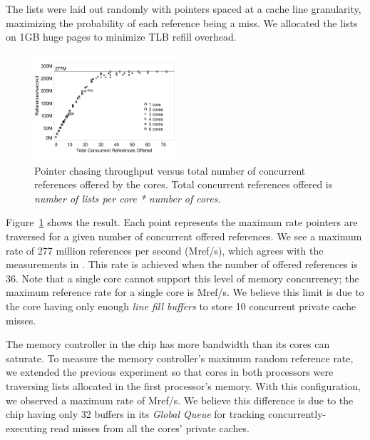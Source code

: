 \documentclass[10pt,nocopyrightspace]{sigplanconf}
\newcommand{\mrps}[1]{\unit[#1]{Mref/s}}
\begin{document}
The lists were laid out randomly with pointers spaced at a cache line granularity, maximizing
the probability of each reference being a miss. We allocated the lists
on 1GB huge pages to minimize TLB refill overhead.

\begin{figure}[t]
  \vspace{-.1in}
	\begin{center}
		\includegraphics[width=0.47\textwidth]{figures/multi-listwalk-totalconc-edited.pdf}
	\end{center}
	\caption{Pointer chasing throughput versus total number of
          concurrent references offered by the cores. Total concurrent references offered is \emph{number of lists per core * number of cores}.
        }
	\label{fig:listwalk-totalconc}
\end{figure}

Figure~\ref{fig:listwalk-totalconc} shows the result. Each point represents
the maximum rate pointers are traversed for a given number of
concurrent offered references. We see a maximum rate of 277 million references per second (\mrps{}), which agrees with the measurements in \cite{Mandal:2010}. This rate is achieved when the number of offered references is 36. Note that a single core cannot support this level of
memory concurrency; the maximum reference rate for a single core is
\mrps{107}. We believe this limit is due to the core having only enough {\em line fill
  buffers} \cite{nehalem:arch} to store 10 concurrent private cache misses.

The memory controller in the chip has more bandwidth than its
cores can saturate. To measure the memory controller's maximum random
reference rate, we extended the previous experiment so that cores in
both processors were traversing lists allocated in the first processor's
memory. With this configuration, we observed a maximum rate of \mrps{360}. We believe this difference is due to the chip having only 32 buffers in its {\em Global Queue} \cite{nehalem:perf} for tracking concurrently-executing read misses from all the cores' private caches.
\end{document}
